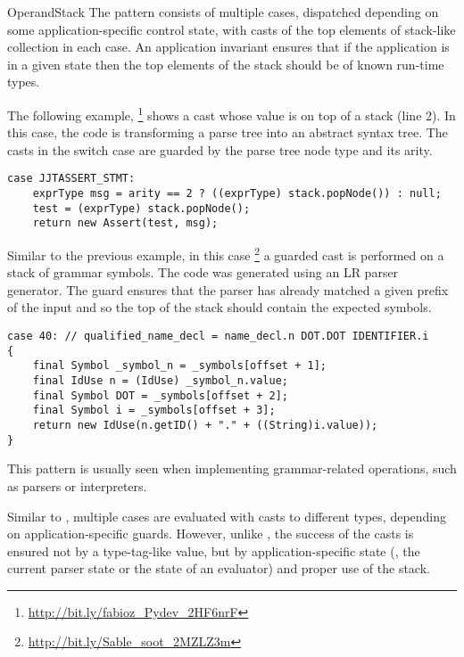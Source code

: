 \begin{pattern}{OperandStack}
The \thisp{} pattern consists of
multiple cases, dispatched depending on some application-specific control state, with
  casts of the top elements of stack-like collection in each case.
An application invariant ensures that if the application is in a given state
then the 
  top elements of the stack should be of known run-time types.

\instances{}
The following example,%
\footnote{\url{http://bit.ly/fabioz_Pydev_2HF6nrF}}
shows a cast whose value is on top of a stack (line 2).
In this case, the code is transforming a parse tree into an abstract syntax
tree. The casts in the switch case are guarded by the parse tree node type and
its arity. 

\begin{verbatim}
case JJTASSERT_STMT:
    exprType msg = arity == 2 ? ((exprType) stack.popNode()) : null;
    test = (exprType) stack.popNode();
    return new Assert(test, msg);
\end{verbatim}

Similar to the previous example,
in this case%
\footnote{\url{http://bit.ly/Sable_soot_2MZLZ3m}}
a guarded cast is performed on a stack of grammar symbols.
The code was generated using an LR parser
generator. The guard 
ensures that the parser has already matched a given prefix of the
input and so the top of the stack should contain the expected symbols.

\begin{verbatim}
case 40: // qualified_name_decl = name_decl.n DOT.DOT IDENTIFIER.i
{
    final Symbol _symbol_n = _symbols[offset + 1];
    final IdUse n = (IdUse) _symbol_n.value;
    final Symbol DOT = _symbols[offset + 2];
    final Symbol i = _symbols[offset + 3];
    return new IdUse(n.getID() + "." + ((String)i.value));
}
\end{verbatim}

\discussion{}
This pattern is usually seen when implementing grammar-related operations,
such as parsers or interpreters.

  Similar to , multiple cases are evaluated
  with casts to different types, depending on application-specific guards.
  However, unlike 
  , 
  the success of the casts is ensured not 
  by a type-tag-like value, but by application-specific state
  (\eg, the current parser state or the state of an evaluator)
  and proper use of the stack.

\end{pattern}
